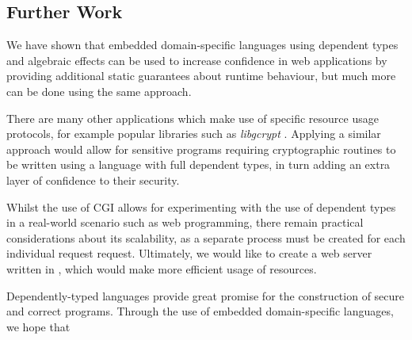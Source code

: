 \documentclass[preprint]{sigplanconf}
\begin{document}
\subsection{Further Work}
We have shown that embedded domain-specific languages using dependent types and algebraic effects can be used to increase confidence in web applications by providing additional static guarantees about runtime behaviour, but much more can be done using the same approach.

There are many other applications which make use of specific resource usage protocols, for example popular libraries such as \textit{libgcrypt} \cite{libgcrypt}. Applying a similar approach would allow for sensitive programs requiring cryptographic routines to be written using a language with full dependent types, in turn adding an extra layer of confidence to their security. 

Whilst the use of CGI allows for experimenting with the use of dependent types in a real-world scenario such as web programming, there remain practical considerations about its scalability, as a separate process must be created for each individual request request. Ultimately, we would like to create a web server written in \idris{}, which would make more efficient usage of resources. 

Dependently-typed languages provide great promise for the construction of secure and correct programs. Through the use of embedded domain-specific languages, we hope that





\acks






%
%
\end{document}
